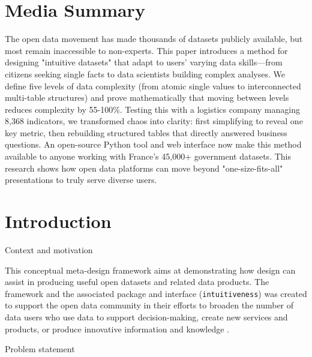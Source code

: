 \documentclass[]{hdsr}
\makeatletter
\def\subsection{\@startsection{subsection}{2}%
  \z@{.5\linespacing\@plus.7\linespacing}{.5\linespacing}%
  {\normalfont\bfseries}}
\theoremstyle{plain}      %
\theoremstyle{definition} %
\theoremstyle{remark}     %
\makeatother
\begin{document}
\copyrightnotice

\section*{Media Summary}
The open data movement has made thousands of datasets publicly available, but most remain inaccessible to non-experts. This paper introduces a method for designing "intuitive datasets" that adapt to users' varying data skills---from citizens seeking single facts to data scientists building complex analyses. We define five levels of data complexity (from atomic single values to interconnected multi-table structures) and prove mathematically that moving between levels reduces complexity by 55-100\%. Testing this with a logistics company managing 8,368 indicators, we transformed chaos into clarity: first simplifying to reveal one key metric, then rebuilding structured tables that directly answered business questions. An open-source Python tool and web interface now make this method available to anyone working with France's 45,000+ government datasets. This research shows how open data platforms can move beyond "one-size-fits-all" presentations to truly serve diverse users.

\restoregeometry
{}



\section{Introduction}

\subsection{Context and motivation}

This conceptual meta-design framework aims at demonstrating how design can assist in producing useful open datasets and related data products. The framework and the associated package and interface (\texttt{intuitiveness}) was created to support the open data community in their efforts to broaden the number of data users \citep{ruppert2012} who use data to support decision-making, create new services and products, or produce innovative information and knowledge \citep{safarov2017}.

\subsection{Problem statement}
\end{document}
